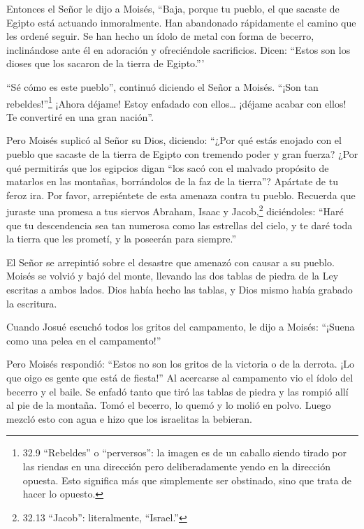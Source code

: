  Entonces el Señor le dijo a Moisés, ``Baja, porque tu
pueblo, el que sacaste de Egipto está actuando inmoralmente.
 Han abandonado rápidamente el camino que les ordené seguir.
Se han hecho un ídolo de metal con forma de becerro, inclinándose ante
él en adoración y ofreciéndole sacrificios. Dicen: ``Estos son los
dioses que los sacaron de la tierra de Egipto.'''

 ``Sé cómo es este pueblo'', continuó diciendo el Señor a
Moisés. ``¡Son tan rebeldes!''\footnote{32.9 ``Rebeldes'' o
  ``perversos'': la imagen es de un caballo siendo tirado por las
  riendas en una dirección pero deliberadamente yendo en la dirección
  opuesta. Esto significa más que simplemente ser obstinado, sino que
  trata de hacer lo opuesto.}  ¡Ahora déjame! Estoy
enfadado con ellos\ldots{} ¡déjame acabar con ellos! Te convertiré en
una gran nación''.

 Pero Moisés suplicó al Señor su Dios, diciendo: ``¿Por qué
estás enojado con el pueblo que sacaste de la tierra de Egipto con
tremendo poder y gran fuerza?  ¿Por qué permitirás que los
egipcios digan ``los sacó con el malvado propósito de matarlos en las
montañas, borrándolos de la faz de la tierra''? Apártate de tu feroz
ira. Por favor, arrepiéntete de esta amenaza contra tu pueblo.
 Recuerda que juraste una promesa a tus siervos Abraham,
Isaac y Jacob,\footnote{32.13 ``Jacob'': literalmente, ``Israel.''}
diciéndoles: ``Haré que tu descendencia sea tan numerosa como las
estrellas del cielo, y te daré toda la tierra que les prometí, y la
poseerán para siempre.''

 El Señor se arrepintió sobre el desastre que amenazó con
causar a su pueblo.  Moisés se volvió y bajó del monte,
llevando las dos tablas de piedra de la Ley escritas a ambos lados.
 Dios había hecho las tablas, y Dios mismo había grabado la
escritura.

 Cuando Josué escuchó todos los gritos del campamento, le
dijo a Moisés: ``¡Suena como una pelea en el campamento!''

 Pero Moisés respondió: ``Estos no son los gritos de la
victoria o de la derrota. ¡Lo que oigo es gente que está de fiesta!''
 Al acercarse al campamento vio el ídolo del becerro y el
baile. Se enfadó tanto que tiró las tablas de piedra y las rompió allí
al pie de la montaña.  Tomó el becerro, lo quemó y lo molió
en polvo. Luego mezcló esto con agua e hizo que los israelitas la
bebieran.

